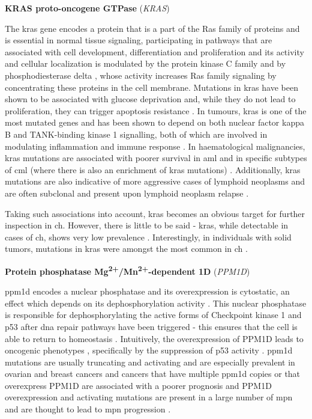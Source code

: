 \noindent \textbf{KRAS proto-oncogene GTPase} (\textit{KRAS})

The \ac{kras} gene encodes a protein that is a part of the Ras family of proteins and is essential in normal tissue signaling, participating in pathways that are associated with cell development, differentiation and proliferation \cite{Kranenburg2005-sl} and its activity and cellular localization is modulated by the protein kinase C family \cite{Bivona2006-jq} and by phosphodiesterase delta \cite{Chandra2011-ij}, whose activity increases Ras family signaling by concentrating these proteins in the cell membrane. Mutations in \ac{kras} have been shown to be associated with glucose deprivation and, while they do not lead to proliferation, they can trigger apoptosis resistance \cite{Yun2009-an}. In tumours, \ac{kras} is one of the most mutated genes \cite{Kranenburg2005-sl} and has been shown to depend on both nuclear factor kappa B and TANK-binding kinase 1 signalling, both of which are involved in modulating inflammation and immune response \cite{Meylan2009-nc,Barbie2009-hz}. In haematological malignancies, \ac{kras} mutations are associated with poorer survival in \ac{aml} \cite{Ball2019-cs} and in specific subtypes of \ac{cml} (where there is also an enrichment of \ac{kras} mutations) \cite{Vendramini2019-oh}. Additionally, \ac{kras} mutations are also indicative of more aggressive cases of lymphoid neoplasms \cite{Neri1988-xj} and are often subclonal and present upon lymphoid neoplasm relapse \cite{Oshima2016-vy,Malinowska-Ozdowy2015-bv}.

Taking such associations into account, \ac{kras} becomes an obvious target for further inspection in \ac{ch}. However, there is little to be said - \ac{kras}, while detectable in cases of \ac{ch}, shows very low prevalence \cite{Wang2019-pl,Genovese2014-eu,Zehir2017-gh,Bolton2020-ct,Xie2014-np}. Interestingly, in individuals with solid tumors, mutations in \ac{kras} were amongst the most common in \ac{ch} \cite{Conces2019-yq,Wang2019-pl}.

\noindent \textbf{Protein phosphatase Mg\textsuperscript{2+}/Mn\textsuperscript{2+}-dependent 1D} (\textit{PPM1D})

\Ac{ppm1d} encodes a nuclear phosphatase and its overexpression is cytostatic, an effect which depends on its dephosphorylation activity \cite{Fiscella1997-ay}. This nuclear phosphatase is responsible for dephosphorylating the active forms of Checkpoint kinase 1 and p53 after \ac{dna} repair pathways have been triggered - this ensures that the cell is able to return to homeostasis \cite{Lu2005-it}. Intuitively, the overexpression of PPM1D leads to oncogenic phenotypes \cite{Li2002-dl}, specifically by the suppression of p53 activity \cite{Bulavin2002-ft}. \ac{ppm1d} mutations are usually truncating and activating and are especially prevalent in ovarian and breast cancers \cite{Bolton2020-ct} and cancers that have multiple \ac{ppm1d} copies or that overexpress PPM1D are associated with a poorer prognosis \cite{Lambros2010-yo,Castellino2008-wr,Yang2015-kz} and PPM1D overexpression and activating mutations are present in a large number of \ac{mpn} and are thought to lead to \ac{mpn} progression \cite{Marcellino2019-ze}. 

